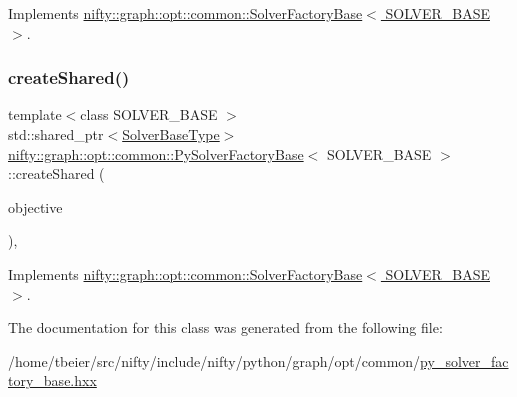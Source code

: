 Implements \hyperlink{classnifty_1_1graph_1_1opt_1_1common_1_1SolverFactoryBase_a590dfdc8643a663d8c8adca6164de8f7}{nifty\+::graph\+::opt\+::common\+::\+Solver\+Factory\+Base$<$ S\+O\+L\+V\+E\+R\+\_\+\+B\+A\+S\+E $>$}.

\mbox{\label{classnifty_1_1graph_1_1opt_1_1common_1_1PySolverFactoryBase_a5a45a0822389b91bfb143ee1150633be}} 
\subsubsection{\texorpdfstring{create\+Shared()}{createShared()}}
{\footnotesize\ttfamily template$<$class S\+O\+L\+V\+E\+R\+\_\+\+B\+A\+SE $>$ \\
std\+::shared\+\_\+ptr$<$\hyperlink{classnifty_1_1graph_1_1opt_1_1common_1_1SolverFactoryBase_a83f347591f4cffa7afb13c8f495dcce2}{Solver\+Base\+Type}$>$ \hyperlink{classnifty_1_1graph_1_1opt_1_1common_1_1PySolverFactoryBase}{nifty\+::graph\+::opt\+::common\+::\+Py\+Solver\+Factory\+Base}$<$ S\+O\+L\+V\+E\+R\+\_\+\+B\+A\+SE $>$\+::create\+Shared (\begin{DoxyParamCaption}\item[{const \hyperlink{classnifty_1_1graph_1_1opt_1_1common_1_1SolverFactoryBase_ab71d93640cf3fbc0bc980450d5db6e45}{Objective\+Type} \&}]{objective }\end{DoxyParamCaption})\hspace{0.3cm}{\ttfamily [inline]}, {\ttfamily [virtual]}}



Implements \hyperlink{classnifty_1_1graph_1_1opt_1_1common_1_1SolverFactoryBase_a95a2e4e53959b7fb168d8ab707b3d4a7}{nifty\+::graph\+::opt\+::common\+::\+Solver\+Factory\+Base$<$ S\+O\+L\+V\+E\+R\+\_\+\+B\+A\+S\+E $>$}.



The documentation for this class was generated from the following file\+:\begin{DoxyCompactItemize}
\item 
/home/tbeier/src/nifty/include/nifty/python/graph/opt/common/\hyperlink{py__solver__factory__base_8hxx}{py\+\_\+solver\+\_\+factory\+\_\+base.\+hxx}\end{DoxyCompactItemize}
